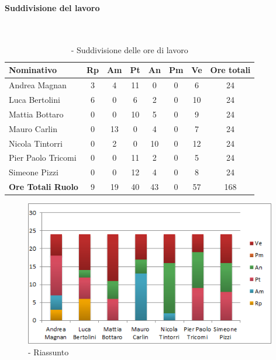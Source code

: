 \documentclass[./PianoDiProgetto.tex]{subfiles}
\begin{document}
	\subsubsection{\PerPD}
				\paragraph{Suddivisione del lavoro}\


	\begin{table}[H]

		\begin{tabularx}{\textwidth}{l  * {6}{c}  c}
			\toprule
			\textbf{Nominativo} & \textbf{Rp} & \textbf{Am} & \textbf{Pt} & \textbf{An} & \textbf{Pm} & \textbf{Ve} & \textbf{Ore totali} \\
			\midrule
			Andrea Magnan      & 3 & 4  & 11 & 0  & 0 & 6  & 24 \\
			Luca Bertolini     & 6 & 0  & 6  & 2  & 0 & 10 & 24 \\
			Mattia Bottaro     & 0 & 0  & 10 & 5  & 0 & 9 & 24 \\
			Mauro Carlin       & 0 & 13 & 0  & 4  & 0 & 7  & 24 \\
			Nicola Tintorri    & 0 & 2  & 0  & 10 & 0 & 12  & 24 \\
			Pier Paolo Tricomi & 0 & 0  & 11  & 2 & 0 & 5  & 24 \\
			Simeone Pizzi      & 0 & 0  & 12  & 4  & 0 & 8  & 24 \\
			\midrule
			\textbf{Ore Totali Ruolo}& 9 & 19 & 40 & 43 & 0 & 57 & 168 \\
			\bottomrule
		\end{tabularx}
		\caption{\PerPD{} - Suddivisione delle ore di lavoro}

	\end{table}
\vfill
\newpage
\vfill

	\begin{figure}[H]
		\centering
		\includegraphics[width=11cm, trim=1cm 0cm 1cm 0cm]{grafici/Pd-persona}
			\caption{\PerPD{} - Riassunto}

	\end{figure}
\vfill
\end{document}
